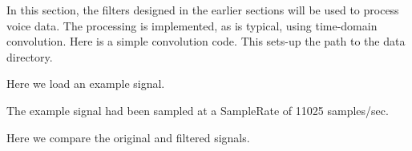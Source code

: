 \documentclass{article}
\begin{document}
\begin{CellGroup}


In this section, the filters designed in the earlier sections will be used to process voice data. The processing is implemented, as is typical, using
time-domain convolution. Here is a simple convolution code. This sets-up the path to the data directory.

Here we load an example signal.

 The example signal had been sampled at a SampleRate of 11025 samples/sec.

Here we compare the original and filtered signals.

\begin{CellGroup}

\end{CellGroup}

\end{CellGroup}
\end{document}
